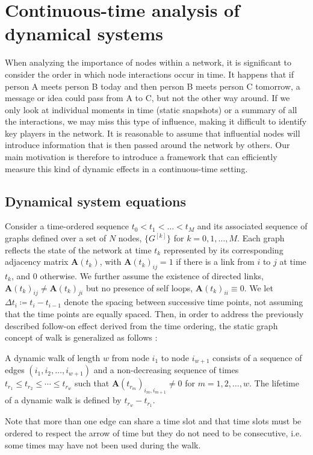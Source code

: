 \chapter{Continuous-time analysis of dynamical systems}
\label{chap:cont}
When analyzing the importance of nodes within a network, it is significant to consider the order in which node interactions occur in time. It happens that if person A meets person B today and then person B meets person C tomorrow, a message or idea could pass from A to C, but not the other way around. If we only look at individual moments in time (static snapshots) or a summary of all the interactions, we may miss this type of influence, making it difficult to identify key players in the network. It is reasonable to assume that influential nodes will introduce information that is then passed around the network by others. Our main motivation is therefore to introduce a framework that can efficiently measure this kind of dynamic effects in a continuous-time setting.

\section{Dynamical system equations}
\label{sec:ode}
Consider a time-ordered sequence $t_0 < t_1 < \dots < t_M $ and its associated sequence of graphs defined over a set of $N$ nodes, $\{G^{[k]}\}$ for $k = 0,1,\dots,M$. Each graph reflects the state of the network at time $t_k$ represented by its corresponding adjacency matrix $\mathbf{A}(t_k)$, with $\mathbf{A}(t_k)_{ij} = 1$ if there is a link from $i$ to $j$ at time $t_k$, and $0$ otherwise. We further assume the existence of directed links, $\mathbf{A}(t_k)_{ij} \ne \mathbf{A}(t_k)_{ji}$ but no presence of self loops, $\mathbf{A}(t_k)_{ii} \equiv 0$. We let $\Delta t_i \coloneqq t_i - t_{i-1}$ denote the spacing between successive time points, not assuming that the time points are equally spaced. Then, in order to address the previously described follow-on effect derived from the time ordering, the static graph concept of walk is generalized as follows \cite{grindrod2011communicability}:
\begin{definition}
    A dynamic walk of length $w$ from node $i_1$ to node $i_{w+1}$ consists of a sequence of edges $(i_1,i_2,\dots,i_{w+1})$ and a non-decreasing sequence of times $t_{r_1}\le t_{r_2}\le \cdots \le t_{r_w}$ such that $\mathbf{A}(t_{r_m})_{i_m,i_{m+1}}\ne 0$ for $m=1,2,\dots,w$. The lifetime of a dynamic walk is defined by $t_{r_w} - t_{r_1}$. 
\end{definition}
Note that more than one edge can share a time slot and that time slots must be ordered to respect the arrow of time but they do not need to be consecutive, i.e. some times may have not been used during the walk.

